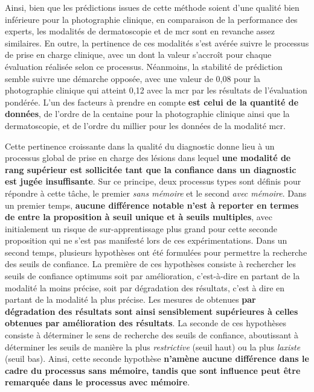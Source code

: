 Ainsi, bien que les prédictions issues de cette méthode soient d'une qualité bien inférieure pour la photographie clinique, en comparaison de la performance des experts, les modalités de dermatoscopie et de \gls{mcr} sont en revanche assez similaires. En outre, la pertinence de ces modalités s'est avérée suivre le processus de prise en charge clinique, avec un \fscore{} dont la valeur s'accroît pour chaque évaluation réalisée selon ce processus. Néanmoins, la stabilité de prédiction semble suivre une démarche opposée, avec une valeur de 0,08 pour la photographie clinique qui atteint 0,12 avec la \gls{mcr} par les résultats de l'évaluation pondérée. L'un des facteurs à prendre en compte \textbf{est celui de la quantité de données}, de l'ordre de la centaine pour la photographie clinique ainsi que la dermatoscopie, et de l'ordre du millier pour les données de la modalité \gls{mcr}.\par

Cette pertinence croissante dans la qualité du diagnostic donne lieu à un processus global de prise en charge des lésions dans lequel \textbf{une modalité de rang supérieur est sollicitée tant que la confiance dans un diagnostic est jugée insuffisante}. Sur ce principe, deux processus types sont définis pour répondre à cette tâche, le premier \textit{sans mémoire} et le second \textit{avec mémoire}. Dans un premier temps, \textbf{aucune différence notable n'est à reporter en termes de \fscore{} entre la proposition à seuil unique et à seuils multiples}, avec initialement un risque de sur-apprentissage plus grand pour cette seconde proposition qui ne s'est pas manifesté lors de ces expérimentations. Dans un second temps, plusieurs hypothèses ont été formulées pour permettre la recherche des seuils de confiance. La première de ces hypothèses consiste à rechercher les seuils de confiance optimums soit par amélioration, c'est-à-dire en partant de la modalité la moins précise, soit par dégradation des résultats, c'est à dire en partant de la modalité la plus précise. Les mesures de \fscore{} obtenues \textbf{par dégradation des résultats sont ainsi sensiblement supérieures à celles obtenues par amélioration des résultats}. La seconde de ces hypothèses consiste à déterminer le sens de recherche des seuils de confiance, aboutissant à déterminer les seuils de manière la plus \textit{restrictive} (seuil haut) ou la plus \textit{laxiste} (seuil bas). Ainsi, cette seconde hypothèse \textbf{n'amène aucune différence dans le cadre du processus sans mémoire, tandis que sont influence peut être remarquée dans le processus avec mémoire}.\par
\clearpage

